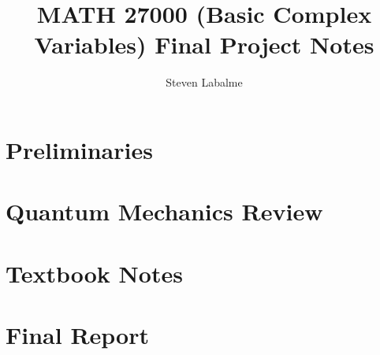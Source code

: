 \documentclass[titlepage]{article}
\title{MATH 27000 (Basic Complex Variables) Final Project Notes}
\author{Steven Labalme}
\begin{document}
\maketitle



\tableofcontents
\newpage



\pagestyle{empty}
\part{Preliminaries}
\newpage

\pagestyle{main}
\renewcommand{\leftmark}{Final Project Proposal Form}
\renewcommand{\proofname}{Answer}

\renewcommand{\proofname}{Proof}
\newpage

\renewcommand{\leftmark}{Proposal Feedback}

\newpage


\pagestyle{empty}
\part{Quantum Mechanics Review}
\newpage

\pagestyle{main}
\renewcommand{\leftmark}{CHEM 26100 Notes}

\newpage

\renewcommand{\leftmark}{PHYS 23410 Notes}

\newpage


\pagestyle{empty}
\part{Textbook Notes}
\newpage

\pagestyle{main}
\renewcommand{\leftmark}{\firstmark}
\renewcommand{\sectionmark}[1]{\markboth{Chapter \thesection\ (#1)}{}}
\renewcommand{\subsectionmark}[1]{}

\newpage


\newpage


\newpage


\newpage


\newpage


\newpage


\newpage


\newpage


\newpage


\newpage


\pagestyle{empty}
\part{Final Report}
\newpage

\pagestyle{main}
\renewcommand{\leftmark}{Report and Presentation Outline}

\end{document}
